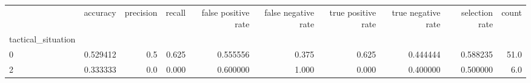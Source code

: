 \begin{tabular}{lrrrrrrrrr}
\toprule
{} &  accuracy &  precision &  recall &  false positive rate &  false negative rate &  true positive rate &  true negative rate &  selection rate &  count \\
tactical\_situation &           &            &         &                      &                      &                     &                     &                 &        \\
\midrule
0                  &  0.529412 &        0.5 &   0.625 &             0.555556 &                0.375 &               0.625 &            0.444444 &        0.588235 &   51.0 \\
2                  &  0.333333 &        0.0 &   0.000 &             0.600000 &                1.000 &               0.000 &            0.400000 &        0.500000 &    6.0 \\
\bottomrule
\end{tabular}
